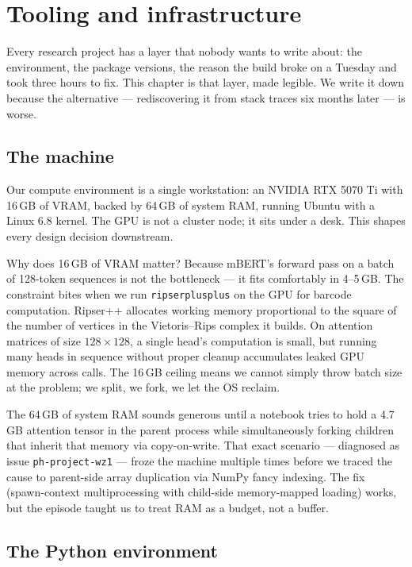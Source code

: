 \chapter{Tooling and infrastructure}
\label{ch:tooling}

Every research project has a layer that nobody wants to write about: the environment, the package versions, the reason the build broke on a Tuesday and took three hours to fix. This chapter is that layer, made legible. We write it down because the alternative --- rediscovering it from stack traces six months later --- is worse.

\section{The machine}

Our compute environment is a single workstation: an NVIDIA RTX 5070 Ti with 16\,GB of VRAM, backed by 64\,GB of system RAM, running Ubuntu with a Linux 6.8 kernel. The GPU is not a cluster node; it sits under a desk. This shapes every design decision downstream.

Why does 16\,GB of VRAM matter? Because mBERT's forward pass on a batch of 128-token sequences is not the bottleneck --- it fits comfortably in 4--5\,GB. The constraint bites when we run \texttt{ripserplusplus} on the GPU for barcode computation. Ripser++ allocates working memory proportional to the square of the number of vertices in the Vietoris--Rips complex it builds. On attention matrices of size $128 \times 128$, a single head's computation is small, but running many heads in sequence without proper cleanup accumulates leaked GPU memory across calls. The 16\,GB ceiling means we cannot simply throw batch size at the problem; we split, we fork, we let the OS reclaim.

The 64\,GB of system RAM sounds generous until a notebook tries to hold a 4.7\,GB attention tensor in the parent process while simultaneously forking children that inherit that memory via copy-on-write. That exact scenario --- diagnosed as issue \texttt{ph-project-wz1} --- froze the machine multiple times before we traced the cause to parent-side array duplication via NumPy fancy indexing. The fix (spawn-context multiprocessing with child-side memory-mapped loading) works, but the episode taught us to treat RAM as a budget, not a buffer.

\section{The Python environment}

